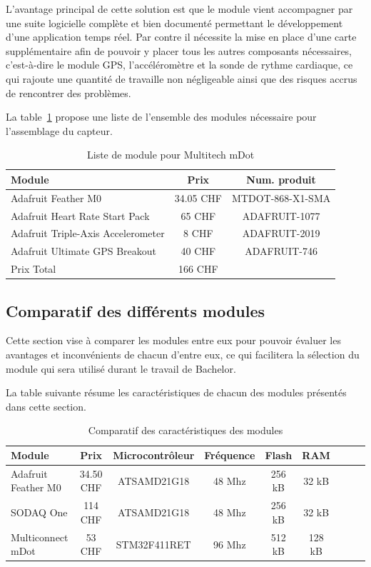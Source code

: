 L’avantage principal de cette solution est que le module vient accompagner par une suite logicielle complète et bien documenté permettant le développement d’une application temps réel. Par contre il nécessite la mise en place d’une carte supplémentaire afin de pouvoir y placer tous les autres composants nécessaires, c’est-à-dire le module GPS, l’accéléromètre et la sonde de rythme cardiaque, ce qui rajoute une quantité de travaille non négligeable ainsi que des risques accrus de rencontrer des problèmes.

La table~\ref{tab:mdot_liste} propose une liste de l'ensemble des modules nécessaire pour l'assemblage du capteur.

\begin{table}[htb]
\caption[Multitech mDot List]{Liste de module pour Multitech mDot}
\label{tab:mdot_liste}
\centering
\begin{tabular}{lcc}
\toprule
Module & Prix & Num. produit \\ 
\midrule
Adafruit Feather M0 & 34.05 CHF & MTDOT-868-X1-SMA \\
Adafruit Heart Rate Start Pack & 65 CHF & ADAFRUIT-1077 \\
Adafruit Triple-Axis Accelerometer & 8 CHF & ADAFRUIT-2019 \\
Adafruit Ultimate GPS Breakout & 40 CHF & ADAFRUIT-746 \\
\midrule
Prix Total & 166 CHF &  \\
\bottomrule 
\end{tabular}
\end{table}

\subsection{Comparatif des différents modules}

Cette section vise à comparer les modules entre eux pour pouvoir évaluer les avantages et inconvénients de chacun d’entre eux, ce qui facilitera la sélection du module qui sera utilisé durant le travail de Bachelor.

La table suivante résume les caractéristiques de chacun des modules présentés dans cette section.

\begin{table}[htb]
\caption[Comparatif Microcontroleur]{Comparatif des caractéristiques des modules}
\label{tab:comparatif_micro}
\centering
\begin{tabular}{lcccccccc}
\toprule
Module & Prix & Microcontrôleur & Fréquence & Flash & RAM  \\ 
\midrule
Adafruit Feather M0	& 34.50 CHF	& ATSAMD21G18 & 48 Mhz & 256 kB & 32 kB & \\
SODAQ One	& 114 CHF & ATSAMD21G18 & 48 Mhz & 256 kB & 32 kB \\
Multiconnect mDot & 53 CHF & STM32F411RET & 96 Mhz & 512 kB & 128 kB \\
\bottomrule 
\end{tabular}
\end{table}

